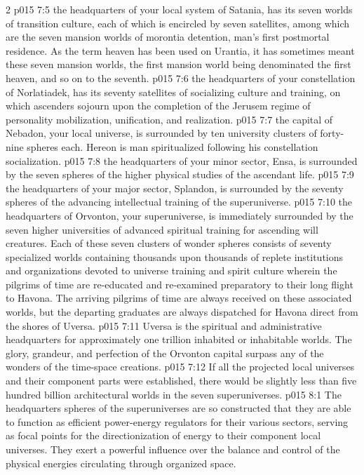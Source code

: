 \begin{multicols}{2}
\pc \vs p015 7:5  the headquarters of your local system of Satania, has its seven worlds of transition culture, each of which is encircled by seven satellites, among which are the seven mansion worlds of morontia detention, man’s first postmortal residence. As the term heaven has been used on Urantia, it has sometimes meant these seven mansion worlds, the first mansion world being denominated the first heaven, and so on to the seventh.\plusone
\pc \vs p015 7:6  the headquarters of your constellation of Norlatiadek, has its seventy satellites of socializing culture and training, on which ascenders sojourn upon the completion of the Jerusem regime of personality mobilization, unification, and realization.\plusone
\pc \vs p015 7:7  the capital of Nebadon, your local universe, is surrounded by ten university clusters of forty\hyp{}nine spheres each. Hereon is man spiritualized following his constellation socialization.
\pc \vs p015 7:8  the headquarters of your minor sector, Ensa, is surrounded by the seven spheres of the higher physical studies of the ascendant life.
\pc \vs p015 7:9  the headquarters of your major sector, Splandon, is surrounded by the seventy spheres of the advancing intellectual training of the superuniverse.
\pc \vs p015 7:10  the headquarters of Orvonton, your superuniverse, is immediately surrounded by the seven higher universities of advanced spiritual training for ascending will creatures. Each of these seven clusters of wonder spheres consists of seventy specialized worlds containing thousands upon thousands of replete institutions and organizations devoted to universe training and spirit culture wherein the pilgrims of time are re\hyp{}educated and re\hyp{}examined preparatory to their long flight to Havona. The arriving pilgrims of time are always received on these associated worlds, but the departing graduates are always dispatched for Havona direct from the shores of Uversa.
\vs p015 7:11 Uversa is the spiritual and administrative headquarters for approximately one trillion inhabited or inhabitable worlds. The glory, grandeur, and perfection of the Orvonton capital surpass any of the wonders of the time\hyp{}space creations.
\pc \vs p015 7:12 If all the projected local universes and their component parts were established, there would be slightly less than five hundred billion architectural worlds in the seven superuniverses.
\vs p015 8:1 The headquarters spheres of the superuniverses are so constructed that they are able to function as efficient power\hyp{}energy regulators for their various sectors, serving as focal points for the directionization of energy to their component local universes. They exert a powerful influence over the balance and control of the physical energies circulating through organized space.

\end{multicols}
